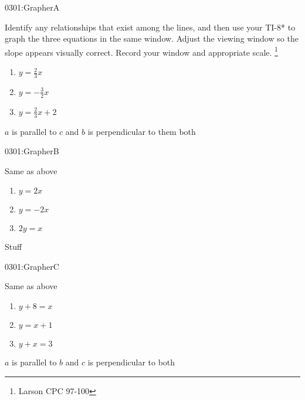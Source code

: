 \begin{defproblem}{0301:GrapherA}%
\begin{onlyproblem}%
\begin{exercise}
Identify any relationships that exist among the lines, and then use
your TI-8* to graph the three equations in the same window.  Adjust
the viewing window so the slope appears visually correct.  Record
your window and appropriate scale.
\footnote{Larson CPC 97-100}
\begin{enumerate}
\item $y=\frac{2}{3}x$
\item $y=-\frac{3}{2}x$
\item $y=\frac{2}{3}x+ 2$
\end{enumerate}
\end{exercise}
\end{onlyproblem}

\begin{onlysolution}
$a$ is parallel to $c$ and $b$ is perpendicular to them both
\end{onlysolution}
\end{defproblem}

\begin{defproblem}{0301:GrapherB}%
\begin{onlyproblem}%
\begin{exercise}
Same as above
\begin{enumerate}
\item $y=2x$
\item $y=-2x$
\item $2y=x$
\end{enumerate}
\end{exercise}
\end{onlyproblem}

\begin{onlysolution}
Stuff
\end{onlysolution}
\end{defproblem}

\begin{defproblem}{0301:GrapherC}%
\begin{onlyproblem}%
\begin{exercise}
Same as above
\begin{enumerate}
\item $y+8=x$
\item $y=x+1$
\item $y+x=3$
\end{enumerate}
\end{exercise}
\end{onlyproblem}
\begin{onlysolution}
$a$ is parallel to $b$ and $c$ is perpendicular to both
\end{onlysolution}
\end{defproblem}

